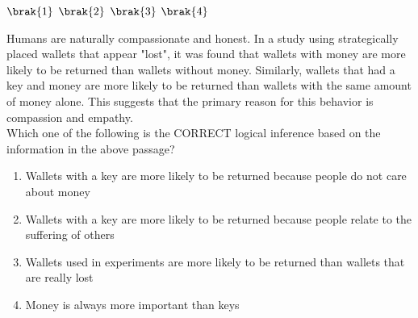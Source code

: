 
     $\brak{1}$ \hspace{1cm} $\brak{2}$ \hspace{1cm} $\brak{3}$ \hspace{1cm} $\brak{4}$

    \item Humans are naturally compassionate and honest. In a study using strategically placed wallets that appear "lost", it was found that wallets with money are more likely to be returned than wallets without money. Similarly, wallets that had a key and money are more likely to be returned than wallets with the same amount of money alone. This suggests that the primary reason for this behavior is compassion and empathy.\\Which one of the following is the CORRECT logical inference based on the information in the above passage?
    \begin{enumerate}
        \item Wallets with a key are more likely to be returned because people do not care about money
        \item Wallets with a key are more likely to be returned because people relate to the suffering of others
        \item Wallets used in experiments are more likely to be returned than wallets that are really lost 
        \item Money is always more important than keys
    \end{enumerate}


